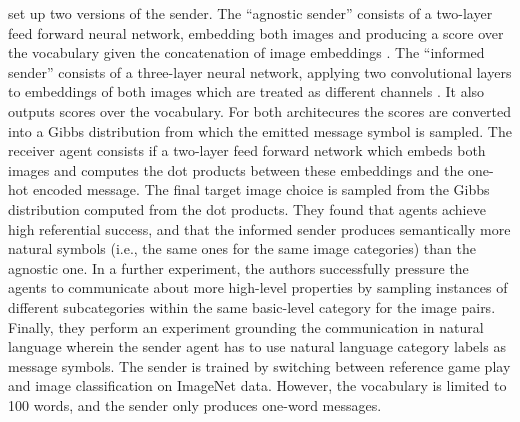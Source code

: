 \cite{lazaridou2016multi} set up two versions of the sender. The ``agnostic sender'' consists of a two-layer feed forward neural network, embedding both images and producing a score over the vocabulary given the concatenation of image embeddings \parencite[][p. 3]{lazaridou2016multi}. The ``informed sender'' consists of a three-layer neural network, applying two convolutional layers to embeddings of both images which are treated as different channels \parencite[][p. 3]{lazaridou2016multi}. It also outputs scores over the vocabulary. For both architecures the scores are converted into a Gibbs distribution from which the emitted message symbol is sampled. The receiver agent consists if a two-layer feed forward network which embeds both images and computes the dot products between these embeddings and the one-hot encoded message. The final target image choice is sampled from the Gibbs distribution computed from the dot products. %
They found that agents achieve high referential success, and that the informed sender produces semantically more natural symbols (i.e., the same ones for the same image categories) than the agnostic one. In a further experiment, the authors successfully pressure the agents to communicate about more high-level properties by sampling instances of different subcategories within the same basic-level category for the image pairs.%
Finally, they perform an experiment grounding the communication in natural language wherein the sender agent has to use natural language category labels as message symbols. The sender is trained by switching between reference game play and image classification on ImageNet data. However, the vocabulary is limited to 100 words, and the sender only produces one-word messages. %
	
